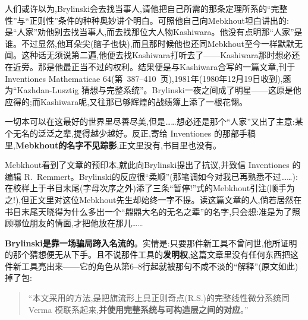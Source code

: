 \noindent 人们或许以为,Brylinski会去找当事人,请他把自己所需的那条定理所系的“完整性”与“正则性”条件的种种奥妙讲个明白。可照他自己向Mebkhout坦白讲出的:是“人家”劝他别去找当事人,而去找那位大人物Kashiwara。他没有点明那“人家”是谁。不过显然,他耳朵尖(脑子也快),而且那时候他也还同Mebkhout至今一样默默无闻。这种话无须说第二遍,他便去找Kashiwara打听去了——Kashiwara那时想必还在近旁。那是他最正当不过的权利。结果便是与Kashiwara合写的一篇文章,刊于 Inventiones Mathematicae 64(第~387--410~页),1981年(1980年12月19日收到),题为“Kazhdan-Lusztig 猜想与完整系统”。Brylinski一夜之间成了明星——这原是他应得的;而Kashiwara呢,又往那已够辉煌的战绩簿上添了一根花翎。

\dmark{}一切本可以在这最好的世界里尽善尽美,但是……想必还是那个“人家”又出了主意:某个无名的泛泛之辈,提得越少越好。反正,寄给 Inventiones 的那部手稿里,\textbf{Mebkhout的名字不见踪影},正文里没有,书目里也没有。

\noindent Mebkhout看到了文章的预印本,就此向Brylinski提出了抗议,并致信 Inventiones 的编辑 R.~Remmert。Brylinski的反应很“柔顺”(那笔调如今对我已再熟悉不过……):在校样上于书目末尾(字母次序之外)添了三条“暂停!”式的Mebkhout引注(顺手为之!),但正文里对这位Mebkhout先生却始终一字不提。读这篇文章的人,倘若居然在书目末尾天晓得为什么多出一个“鼎鼎大名的无名之辈”的名字,只会想:准是为了照顾哪位朋友的情面,才把他放在那儿……

\noindent \textbf{Brylinski是靠一场骗局跨入名流的}。实情是:只要那件新工具不曾问世,他所证明的那个猜想便无从下手。且不说那件工具的\textbf{发明权},这篇文章里没有任何东西把这件新工具亮出来——它的角色从第6--8行起就被那句不咸不淡的“解释”(原文如此)掉了包:

\begin{quote}
“本文采用的方法,是把旗流形上具正则奇点(R.S.)的完整线性微分系统同 Verma 模联系起来,\textbf{并使用完整系统与可构造层之间的对应}。”
\end{quote}

